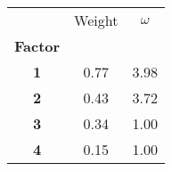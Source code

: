 \begin{tabular}{ccc}
\toprule
{} &  Weight &  $\omega$ \\
\textbf{Factor} &         &           \\
\midrule
\textbf{1     } &    0.77 &      3.98 \\
\textbf{2     } &    0.43 &      3.72 \\
\textbf{3     } &    0.34 &      1.00 \\
\textbf{4     } &    0.15 &      1.00 \\
\bottomrule
\end{tabular}
